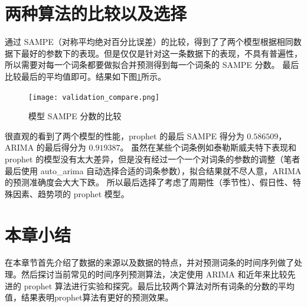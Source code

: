 \section{两种算法的比较以及选择}

通过 SAMPE（对称平均绝对百分比误差）的比较，得到了了两个模型根据相同数据下最好的参数下的表现。但是仅仅是针对这一条数据下的表现，不具有普遍性，所以需要对每一个词条都要做拟合并预测得到每一个词条的 SAMPE 分数。
最后比较最后的平均值即可。结果如下图\ref{compare_model2}所示。

\begin{figure}[htbp]
	\centering
	\texttt{[image: validation\_compare.png]}
	\caption{模型 SAMPE 分数的比较}
	\label{compare_model2}
\end{figure}

很直观的看到了两个模型的性能，prophet 的最后 SAMPE 得分为 $0.586509$，ARIMA 的最后得分为 $0.919387$。
虽然在某些个词条例如泰勒斯威夫特下表现和 prophet 的模型没有太大差异，但是没有经过一个一个对词条的参数的调整（笔者最后使用 auto\_arima 自动选择合适的词条参数），拟合结果就不尽人意，ARIMA 的预测准确度会大大下跌。
所以最后选择了考虑了周期性（季节性）、假日性、特殊因素、趋势项的 prophet 模型。

\section{本章小结}

在本章节首先介绍了数据的来源以及数据的特点，并对预测词条的时间序列做了处理。然后探讨当前常见的时间序列预测算法，决定使用 ARIMA 和近年来比较先进的 prophet 算法进行实验和探究。最后比较两个算法对所有词条的分数的平均值，结果表明prophet算法有更好的预测效果。
